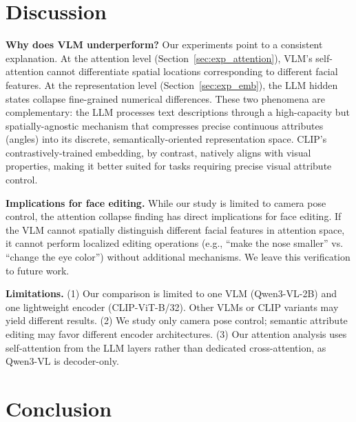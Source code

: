 
\section{Discussion}
\label{sec:disc}

\textbf{Why does VLM underperform?} Our experiments point to a consistent explanation. At the attention level (Section~\ref{sec:exp_attention}), VLM's self-attention cannot differentiate spatial locations corresponding to different facial features. At the representation level (Section~\ref{sec:exp_emb}), the LLM hidden states collapse fine-grained numerical differences. These two phenomena are complementary: the LLM processes text descriptions through a high-capacity but spatially-agnostic mechanism that compresses precise continuous attributes (angles) into its discrete, semantically-oriented representation space. CLIP's contrastively-trained embedding, by contrast, natively aligns with visual properties, making it better suited for tasks requiring precise visual attribute control.

\textbf{Implications for face editing.} While our study is limited to camera pose control, the attention collapse finding has direct implications for face editing. If the VLM cannot spatially distinguish different facial features in attention space, it cannot perform localized editing operations (e.g., ``make the nose smaller'' vs. ``change the eye color'') without additional mechanisms. We leave this verification to future work.

\textbf{Limitations.} (1) Our comparison is limited to one VLM (Qwen3-VL-2B) and one lightweight encoder (CLIP-ViT-B/32). Other VLMs or CLIP variants may yield different results. (2) We study only camera pose control; semantic attribute editing may favor different encoder architectures. (3) Our attention analysis uses self-attention from the LLM layers rather than dedicated cross-attention, as Qwen3-VL is decoder-only.

\section{Conclusion}
\label{sec:conc}

